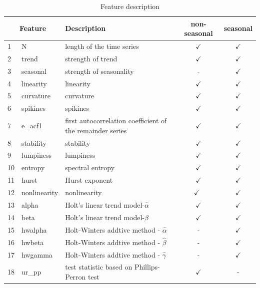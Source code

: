 \documentclass[11pt,]{article}
\theoremstyle{definition}
\theoremstyle{definition}
\theoremstyle{definition}
\theoremstyle{remark}
\begin{document}
\begin{table}[!h]
\centering
\caption{Feature description}
\label{feature}
\begin{tabular}{l|llcc}
\hline
\multicolumn{2}{c}{Feature} & Description & non-seasonal &  seasonal\\ \hline
   1        &   N        & length of the time series & $\checkmark$ & $\checkmark$ \\ 
    2     &   trend        & strength of trend & $\checkmark$ &  $\checkmark$\\ 
    3       &    seasonal       & strength of seasonality & - & $\checkmark$  \\ 
    4     &  linearity         &linearity  & $\checkmark$  & $\checkmark$ \\
    5       &     curvature      & curvature & $\checkmark$ &  $\checkmark$ \\ 
    6       &  spikines         &  spikines  & $\checkmark$ & $\checkmark$ \\ 
  7      &   e\_acf1        & first autocorrelation coefficient of the remainder series & $\checkmark$ & $\checkmark$  \\
        8   &  stability         & stability & $\checkmark$ & $\checkmark$ \\ 
      9       &     lumpiness      & lumpiness & $\checkmark$ & $\checkmark$ \\ 
      10    &       entropy    &  spectral entropy & $\checkmark$ & $\checkmark$ \\ 
            11   &  hurst         & Hurst exponent & $\checkmark$ & $\checkmark$ \\ 
               12        &     nonlinearity      & nonlinearity & $\checkmark$\ & $\checkmark$ \\ 
                   13       &    alpha       &   Holt's linear trend model-$\hat\alpha$ & $\checkmark$ &  $\checkmark$ \\ 
   14        &   beta        &   Holt's linear trend model-$\hat\beta$   & $\checkmark$ &  $\checkmark$\\ 
       15       &    hwalpha       & Holt-Winters addtive method - $\hat\alpha$ & - &  $\checkmark$ \\ 
    16       &    hwbeta       & Holt-Winters addtive method - $\hat\beta$ & - & $\checkmark$ \\ 
    17       &    hwgamma       & Holt-Winters addtive method - $\hat\gamma$ & - & $\checkmark$  \\ 
      18         &    ur\_pp       & test statistic based on Phillips-Perron test & $\checkmark$ & - \\ 

\end{tabular}
\end{table}
\end{document}
